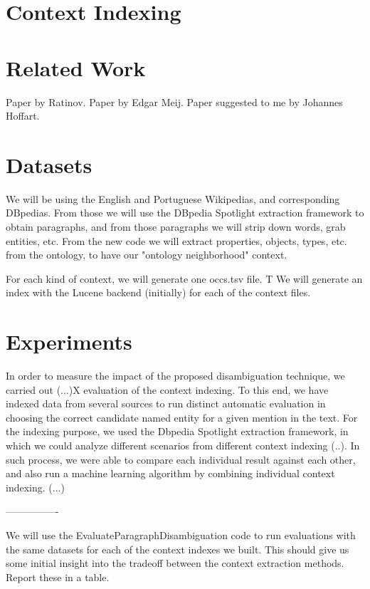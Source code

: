 \documentclass[10pt,a4paper]{article}
\begin{document}
\section{Context Indexing}

\section{Related Work}

Paper by Ratinov. \cite{acl11ratinov}
Paper by Edgar Meij. \cite{wsdm12meij.pdf}
Paper suggested to me by Johannes Hoffart.

\section{Datasets}

We will be using the English and Portuguese Wikipedias, and corresponding DBpedias. From those we will use the DBpedia Spotlight extraction framework to obtain paragraphs, and from those paragraphs we will strip down words, grab entities, etc. From the new code we will extract properties, objects, types, etc. from the ontology, to have our "ontology neighborhood" context. 

For each kind of context, we will generate one occs.tsv file. T
We will generate an index with the Lucene backend (initially) for each of the context files. 

\section{Experiments}

In order to measure the impact of the proposed disambiguation technique, we carried out  (...)X evaluation of the context indexing. To this end, we have indexed data from several sources to run distinct automatic evaluation in choosing the correct candidate named entity for a given mention in the text. For the indexing purpose, we used the Dbpedia Spotlight extraction framework, in which we could analyze different scenarios from different context indexing (..). In such process, we were able to compare each individual result against each other, and also run a machine learning algorithm by combining individual context indexing. (...) 

----------------

We will use the EvaluateParagraphDisambiguation code to run evaluations with the same datasets for each of the context indexes we built. This should give us some initial insight into the tradeoff between the context extraction methods. Report these in a table.
\end{document}
